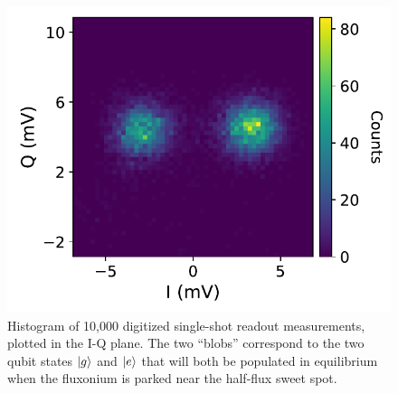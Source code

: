 \begin{figure}[h]
    \centering
    \includegraphics[width=0.6\linewidth]{Figures/4/single_shots.pdf}
    \caption{Histogram of 10,000 digitized single-shot readout measurements, plotted in the I-Q plane. The two ``blobs'' correspond to the two qubit states $\lvert g\rangle$ and $\lvert e\rangle$ that will both be populated in equilibrium when the fluxonium is parked near the half-flux sweet spot.}
\label{fig:4_single_shots}
\end{figure}


\newpage
